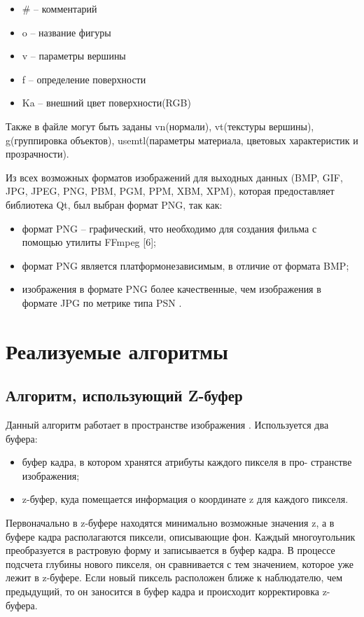 \begin{itemize}
	\item \# -- комментарий
	\item o -- название фигуры
	\item v -- параметры вершины
	\item f -- определение поверхности 
	\item Ka -- внешний цвет поверхности(RGB)
\end{itemize}

Также в файле могут быть заданы vn(нормали), vt(текстуры вершины), g(группировка объектов), usemtl(параметры материала, цветовых характеристик и прозрачности).
\newline

Из всех возможных форматов изображений для выходных данных (BMP, GIF, JPG, JPEG, PNG, PBM, PGM, PPM, XBM, XPM), которая предоставляет библиотека Qt, был выбран формат PNG, так как:
\begin{itemize}
\item формат PNG -- графический, что необходимо для создания фильма с помощью утилиты FFmpeg [6];
\item формат PNG является платформонезависимым, в отличие от формата BMP;
\item изображения в формате PNG более качественные, чем изображения в формате JPG по метрике типа PSN \cite{bib9}.
\end{itemize}

\section{Реализуемые алгоритмы}

\subsection{Алгоритм, использующий Z-буфер}
Данный алгоритм работает в пространстве изображения \cite{bib10}. Используется два буфера:
\begin{itemize}
	\item буфер кадра, в котором хранятся атрибуты каждого пикселя в про-
	странстве изображения;
	\item z-буфер, куда помещается информация о координате z для каждого
	пикселя.
\end{itemize}

Первоначально в z-буфере находятся минимально возможные значения z, а в буфере кадра располагаются пиксели, описывающие фон. Каждый многоугольник преобразуется в растровую форму и записывается в буфер кадра. В процессе подсчета глубины нового пикселя, он сравнивается с тем значением, которое уже лежит в z-буфере. Если новый пиксель расположен ближе к наблюдателю, чем предыдущий, то он заносится в буфер кадра и происходит корректировка z-буфера.

